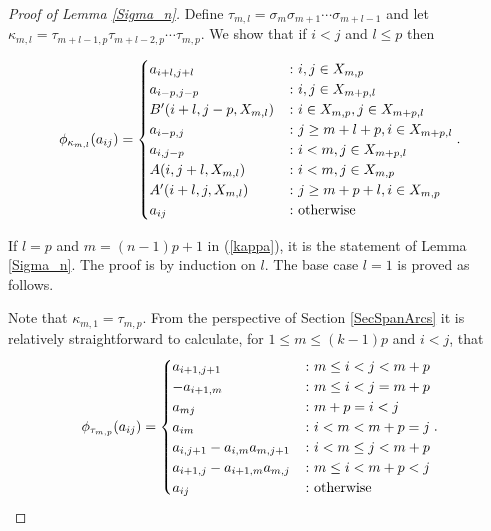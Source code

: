 \documentclass[11pt]{amsart}
\def\s{{\sigma}}
\def\t{{\tau}}
\theoremstyle{definition}
\begin{document}
\begin{proof} [Proof of Lemma \ref{Sigma_n}]
Define $\t_{m,l} = \s_m\s_{m+1}\cdots\s_{m+l-1}$ and let $\kappa_{m,l} = \t_{m+l-1,p}\t_{m+l-2,p}\cdots\t_{m,p}$.  We show that if $i<j$ and $l\le p$ then

\begin{equation}\label{kappa}
\phi_{\kappa_{m,l}}(a_{ij}) =
  \begin{cases}
       a_{i+l,j+l} &\colon i,j\in X_{m,p}\\
       a_{i-p,j-p} & \colon i,j\in X_{m+p,l}\\
       B'(i+l,j-p,X_{m,l}) & \colon i\in X_{m,p}, j\in X_{m+p,l}\\
       a_{i-p,j} &\colon j\ge m+l+p, i\in X_{m+p,l}\\
       a_{i,j-p} & \colon i<m, j\in X_{m+p,l}\\
       A(i,j+l,X_{m,l}) & \colon i<m, j\in X_{m,p}\\
       A'(i+l,j,X_{m,l}) & \colon j\ge m+p+l, i\in X_{m,p}\\
       a_{ij} & \colon \textnormal{otherwise}
  \end{cases}.
\end{equation}

If $l=p$ and $m=(n-1)p+1$ in (\ref{kappa}), it is the statement of Lemma \ref{Sigma_n}. The proof is by induction on $l$. The base case $l=1$ is proved as follows.

Note that $\kappa_{m,1}=\t_{m,p}$. From the perspective of Section \ref{SecSpanArcs} it is relatively straightforward to calculate, for $1\le m \le (k-1)p$ and $i<j$, that
\begin{equation}\label{tau}
\phi_{\t_{m,p}}(a_{ij}) =
  \begin{cases}
       a_{i+1,j+1} & \colon m\le i<j< m+p\\
       -a_{i+1,m} & \colon m\le i < j = m+p\\
       a_{mj} & \colon m+p=i<j\\
       a_{im} & \colon i<m<m+p=j\\
       a_{i,j+1}-a_{i,m}a_{m,j+1} & \colon i<m\le j< m+p\\
       a_{i+1,j}-a_{i+1,m}a_{m,j} & \colon m\le i< m+p<j\\
       a_{ij} & \colon \textnormal{otherwise}
  \end{cases}.
\end{equation}


\end{proof}
\end{document}
